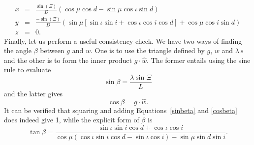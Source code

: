 \documentclass[12pt]{article}
\newcommand{\nn}{\nonumber}
\newcommand{\dt}{\! \cdot \!}
\newcommand{\what}{\hat{w}}
\begin{document}
%
\begin{eqnarray} \label{shadTipCartCoords}
x & = &  \frac{\sin(\Xi)}{D} (\cos\mu\cos d - \sin\mu\cos\iota\sin d)\\ \nn
y & = & \frac{-\sin(\Xi)}{D} (\sin\mu[\sin\iota\sin i + \cos\iota\cos i\cos d] + \cos\mu\cos i\sin d)\\ \nn
z & = & 0.
\end{eqnarray}
%
Finally, let us perform a useful consistency check. We have two ways of finding the angle $\beta$ between $g$ and $w$. One is to use the triangle defined by $g$, $w$ and $\lambda\,s$ and the other is to form the inner product $g \dt \what$. The former entails using the sine rule to evaluate
%
\begin{equation} \label{sinbeta}
\sin\beta = \frac{\lambda\sin\Xi}{L}
\end{equation}
%
and the latter gives
%
\begin{equation}\label{cosbeta}
\cos\beta = g \dt \what.
\end{equation}
%
It can be verified that squaring and adding Equations~\ref{sinbeta} and \ref{cosbeta} does indeed give 1, while the explicit form of $\beta$ is
%
\begin{equation} \label{tanbeta}
\tan\beta = \frac{\sin\iota\sin i\cos d + \cos\iota\cos i}
{\cos\mu( \cos\iota\sin i\cos d - \sin\iota\cos i ) - \sin\mu \sin d \sin i}.
\end{equation}
%
\end{document}
